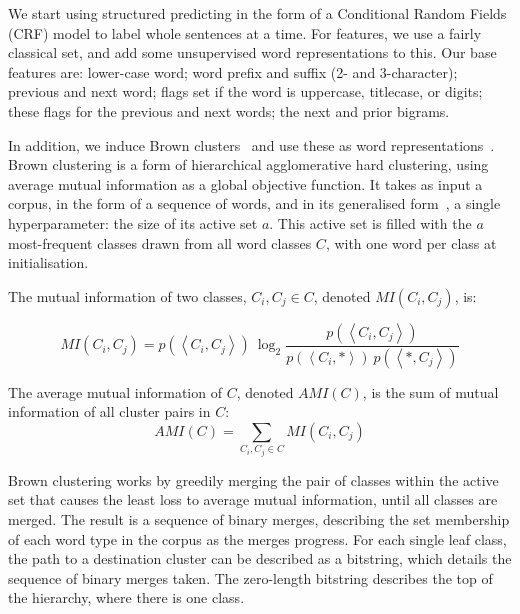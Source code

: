 \documentclass[sigconf,anonymous,review]{acmart}
\begin{document}
We start using structured predicting in the form of a Conditional Random Fields (CRF) model to label whole sentences at a time.
For features, we use a fairly classical set, and add some unsupervised word representations to this.
Our base features are: lower-case word; word prefix and suffix (2- and 3-character); previous and next word; flags set if the word is uppercase, titlecase, or digits; these flags for the previous and next words; the next and prior bigrams.

In addition, we induce Brown clusters~\cite{brown1992class} and use these as word representations~\cite{turian2009preliminary}.
Brown clustering is a form of hierarchical agglomerative hard clustering, using average mutual information as a global objective function.
It takes as input a corpus, in the form of a sequence of words, and in its generalised form~\cite{derczynski2016generalised}, a single hyperparameter: the size of its active set $a$.
This active set is filled with the $a$ most-frequent classes drawn from all word classes $C$, with one word per class at initialisation.

The mutual information of two classes, $C_i,C_j\in C$, denoted $MI(C_i,C_j)$, is:

\begin{equation}
MI(C_i,C_j)=
p(\left<C_i,C_j\right>)\ \log_2{\frac{p(\left<C_i,C_j\right>)}{p(\left<C_i,*\right>)\ p(\left<*,C_j\right>)}}
\end{equation}

The average mutual information of $C$, denoted $AMI(C)$, is the sum of mutual information of all cluster pairs in $C$:
\begin{equation}
AMI(C) = \sum_{C_i,C_j\in C}{MI(C_i,C_j)}
\end{equation}

Brown clustering works by greedily merging the pair of classes within the active set that causes the least loss to average mutual information, until all classes are merged.
The result is a sequence of binary merges, describing the set membership of each word type in the corpus as the merges progress.
For each single leaf class, the path to a destination cluster can be described as a bitstring, which details the sequence of binary merges taken.
The zero-length bitstring describes the top of the hierarchy, where there is one class.
\end{document}
